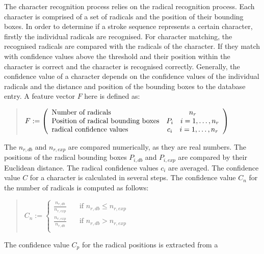 The character recognition process relies on the radical recognition process.
Each character is comprised of a set of radicals and the position of their 
bounding boxes.
In order to determine if a stroke sequence represents a certain character,
firstly the individual radicals are recognised. For character matching,
the recognised radicals are compared with the radicals of the character.
If they match with confidence values above the threshold and their position 
within the character is correct and the character is recognised correctly.
Generally, the confidence value of a character depends on the confidence values
of the individual radicals and the distance and position of the bounding boxes
to the database entry. A feature vector \(F \) here is defined as:
\begin{quote}
\(
    F :=
    \left( 
    \begin {array} {l c} 
        \text{Number of radicals} & n_{r} \\
        \text{Position of radical bounding boxes} & 
                                   P_i \quad i = 1, \ldots, n_{r} \\
        \text{radical confidence values} & c_{i} \quad i = 1, \ldots, n_{r} \\
    \end {array} 
    \right)
\)
\end{quote}
The \(n_{r,db} \) and \(n_{r,exp} \) are compared numerically, as they are real 
numbers. The positions of the radical bounding boxes \(P_{i,db} \) and 
\(P_{i,exp} \) are compared by their Euclidean distance.
The radical confidence values \(c_i\) are averaged.
The confidence value \(C\) for a character is calculated in several steps.
The confidence value \(C_n\) for the number of radicals is computed as follows:
\begin{quote}
\(
   C_n := 
   \begin{cases}
     \frac{n_{r,db}}{n_{r,exp}} & \quad \text{if } n_{r,db} \leq n_{r,exp} \\
     \frac{n_{r,exp}}{n_{r,db}} & \quad \text{if } n_{r,db} > n_{r,exp} \\
   \end{cases}
\)
\end{quote}
The confidence value \(C_p\) for the radical positions is extracted from a 
